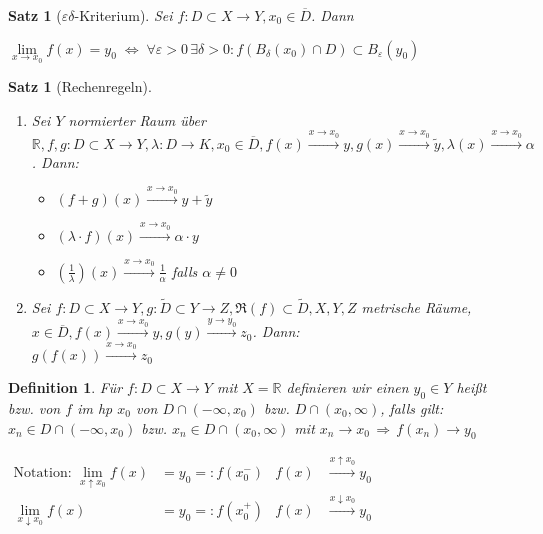 \documentclass[ngerman,a4paper]{report}
\theoremstyle{break}
\newtheorem{satz}[theorem]{Satz}
\newtheorem*{definition}{Definition}
\renewcommand{\epsilon}{\varepsilon}
\begin{document}
\begin{satz}[$\epsilon\delta$-Kriterium]
	Sei $f:D\subset X\to Y, x_0\in\overline{D}$. Dann
	\begin{center}
	$\lim\limits_{x\rightarrow x_0} f(x) = y_0 \;\Leftrightarrow \; \forall\epsilon > 0\,\exists \delta > 0: f(B_\delta(x_0)\cap D)\subset B_\epsilon(y_0)$
	\end{center}
\end{satz}

\begin{satz}[Rechenregeln] \label{satz:rechenregel_stetigkeit}
	\begin{enumerate}[label={\arabic*)}]
		\item Sei $Y$ normierter Raum über $\mathbb{R}, f,g:D\subset X\to Y,\lambda: D\to K, x_0\in\overline{D}, f(x)\overset{x\to x_0}{\longrightarrow} y, g(x) \overset{x\to x_0}{\longrightarrow} \tilde{y}, \lambda(x)\overset{x\to x_0}{\longrightarrow} \alpha$. Dann:
		\begin{itemize}
			\item $(f+g)(x) \overset{x\to x_0}{\longrightarrow} y+\tilde{y}$
			\item $(\lambda \cdot f)(x) \overset{x\to x_0}{\longrightarrow} \alpha\cdot y$
			\item $\left(\frac{1}{\lambda}\right)(x) \overset{x\to x_0}{\longrightarrow} \frac{1}{\alpha}$ falls $\alpha\neq 0$
		\end{itemize}
		\item Sei $f: D\subset X\to Y, g:\tilde{D}\subset Y\to Z, \Re(f)\subset\tilde{D}, X,Y,Z$ metrische Räume, $x\in\overline{D}, f(x)\overset{x\to x_0}{\longrightarrow}y, g(y)\overset{y\to y_0}{\longrightarrow} z_0$. Dann:\\
		$g(f(x)) \overset{x\to x_0}{\longrightarrow} z_0$
	\end{enumerate}
\end{satz}

\begin{definition}
	Für $f:D\subset X\to Y$ mit $X=\mathbb{R}$ definieren wir einen  $y_0\in Y$ heißt  bzw.  von $f$ im \gls{hp} $x_0$ von $D\cap(-\infty, x_0)$ bzw. $D\cap(x_0,\infty)$, falls gilt: $x_n\in D\cap(-\infty, x_0)$ bzw. $x_n\in D\cap (x_0,\infty)$ mit $x_n\to x_0\,\Rightarrow \,f(x_n)\to y_0$
	
	$\begin{aligned}
		\text{Notation: } \lim\limits_{x\uparrow x_0} f(x) &= y_0 =: f(x_0^-)& f(x)&\overset{x\uparrow x_0}{\longrightarrow} y_0 \\
		\lim\limits_{x\downarrow x_0}f(x) &= y_0 =:f(x_0^+) & f(x) &\overset{x\downarrow x_0}{\longrightarrow} y_0
	\end{aligned}$
\end{definition}
\end{document}
